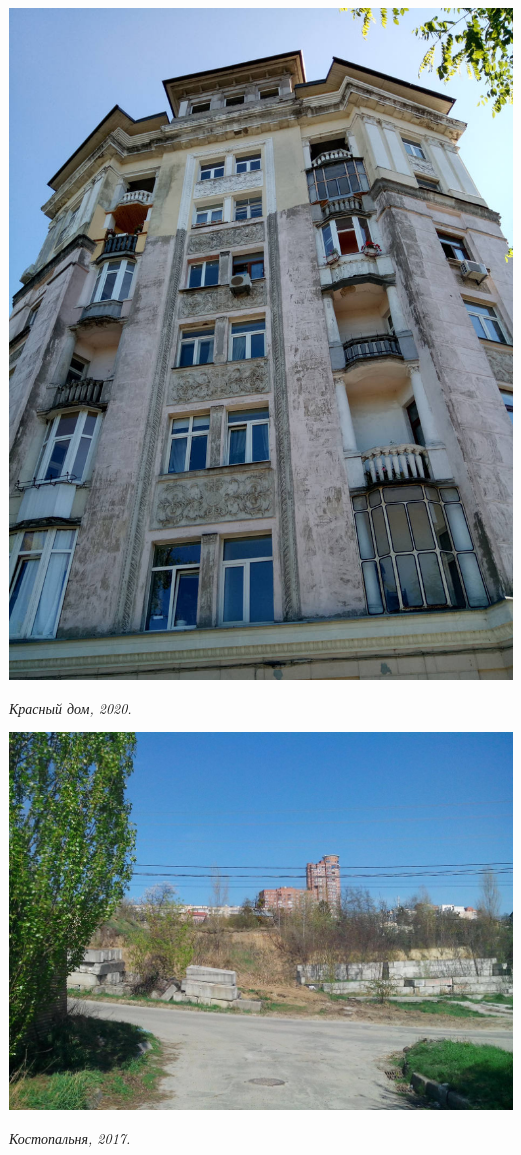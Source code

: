 \newpage

\begin{center}
\includegraphics[width=\linewidth]{rpix/IMG_20200815_143315.jpg}

\textit{Красный дом, 2020.}
\end{center}


\begin{center}
\includegraphics[width=\linewidth]{rpix/IMG_20170411_145319.jpg}

\textit{Костопальня, 2017.}
\end{center}


